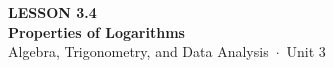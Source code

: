 \documentclass[aspectratio=169, 11pt]{beamer}
\begin{document}
{
\begin{frame}[plain]
  \vspace{2.8cm}\hspace{0.55cm}%
  \begin{minipage}{0.9\textwidth}
    {\color{goldacc}\bfseries\small LESSON 3.4}\\[0.5cm]
    {\color{white}\bfseries\LARGE Properties of Logarithms}\\[1.2cm]
    {\color{mistmid}\small Algebra, Trigonometry, and Data Analysis~$\cdot$~Unit 3}
  \end{minipage}
\end{frame}
}

\begin{frame}[t, plain]
\end{frame}
\end{document}
